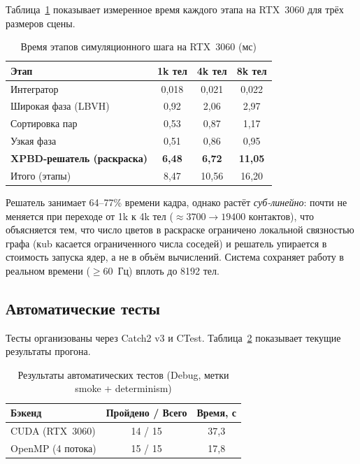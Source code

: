 Таблица~\ref{tab:stage_profile} показывает измеренное время каждого этапа на RTX~3060 для трёх размеров сцены.

\begin{table}[h]
\centering
\caption{Время этапов симуляционного шага на RTX~3060 (мс)}
\label{tab:stage_profile}
\begin{tabular}{lccc}
\toprule
\textbf{Этап} & \textbf{1k тел} & \textbf{4k тел} & \textbf{8k тел} \\
\midrule
Интегратор           & 0{,}018 & 0{,}021 & 0{,}022 \\
Широкая фаза (LBVH)  & 0{,}92  & 2{,}06  & 2{,}97  \\
Сортировка пар       & 0{,}53  & 0{,}87  & 1{,}17  \\
Узкая фаза           & 0{,}51  & 0{,}86  & 0{,}95  \\
\textbf{XPBD-решатель (раскраска)} & \textbf{6{,}48} & \textbf{6{,}72} & \textbf{11{,}05} \\
\midrule
Итого (этапы)        & 8{,}47 & 10{,}56 & 16{,}20 \\
\bottomrule
\end{tabular}
\end{table}

Решатель занимает 64--77\% времени кадра, однако растёт \emph{суб-линейно}: почти не меняется при переходе от 
1k к 4k тел (${\approx}3700 \to 19400$ контактов), что объясняется тем, что число цветов в раскраске 
ограничено локальной связностью графа (кub касается ограниченного числа соседей) и решатель упирается в 
стоимость запуска ядер, а не в объём вычислений. Система сохраняет работу в реальном времени ($\geq 60$~Гц) 
вплоть до 8192 тел.

\subsection{Автоматические тесты}

Тесты организованы через Catch2 v3 и CTest. Таблица~\ref{tab:test_suite} показывает текущие результаты 
прогона.

\begin{table}[h]
\centering
\caption{Результаты автоматических тестов (Debug, метки smoke + determinism)}
\label{tab:test_suite}
\begin{tabular}{lcc}
\toprule
\textbf{Бэкенд} & \textbf{Пройдено / Всего} & \textbf{Время, с} \\
\midrule
CUDA (RTX~3060)   & 14 / 15 & 37{,}3 \\
OpenMP (4 потока) & 15 / 15 & 17{,}8 \\
\bottomrule
\end{tabular}
\end{table}

